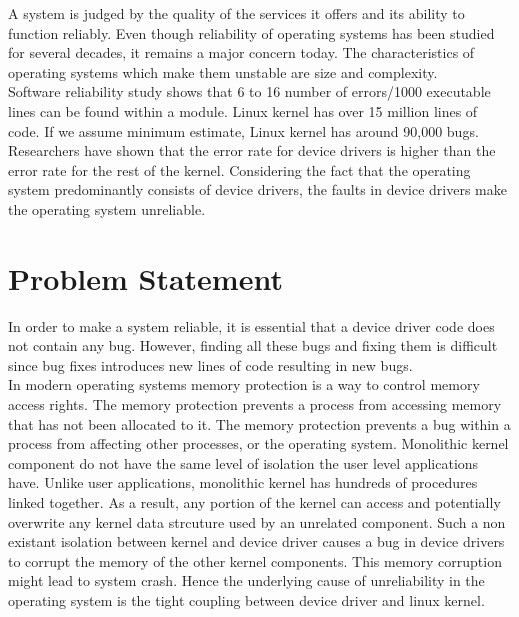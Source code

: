 
A system is judged by the quality of the services it offers and its ability to function reliably. Even though reliability of operating systems has been studied for several decades, it remains a major concern today. The characteristics of operating systems which make them unstable are size and complexity. 
\\
Software reliability study shows that 6 to 16 number of errors/1000 executable lines can be found within a module\cite{Basili:1984:SEC:69605.2085}\cite{Tanenbaum06canwe}. Linux kernel has over 15 million lines of code. If we assume minimum estimate, Linux kernel has around 90,000 bugs. Researchers have shown that the error rate for device drivers is higher than the error rate for the rest of the kernel\cite{Chou:2001:ESO:502034.502042}. Considering the fact that the operating system predominantly consists of device drivers, the faults in device drivers make the operating system unreliable\cite{Chou:2001:ESO:502034.502042}.

\pagebreak

\section {Problem Statement}

In order to make a system reliable, it is essential that a device driver code does not contain any bug. However, finding all these bugs and fixing them is difficult since bug fixes introduces new lines of code resulting in new bugs. 
\\
In modern operating systems memory protection is a way to control memory access rights. The memory protection prevents a process from accessing memory that has not been allocated to it. The memory protection prevents a bug within a process from affecting other processes, or the operating system\cite{Denning:1970:VM:356571.356573}\cite{Galvin}. Monolithic kernel component do not have the same level of isolation the user level applications have. Unlike user applications, monolithic kernel has hundreds of procedures linked together. As a result, any portion of the kernel can access and potentially overwrite any kernel data strcuture used by an unrelated component. Such a non existant isolation between kernel and device driver causes a bug in device drivers to corrupt the memory of the other kernel components. This memory corruption might lead to system crash. Hence the underlying cause of unreliability in the operating system is the tight coupling between device driver and linux kernel.

